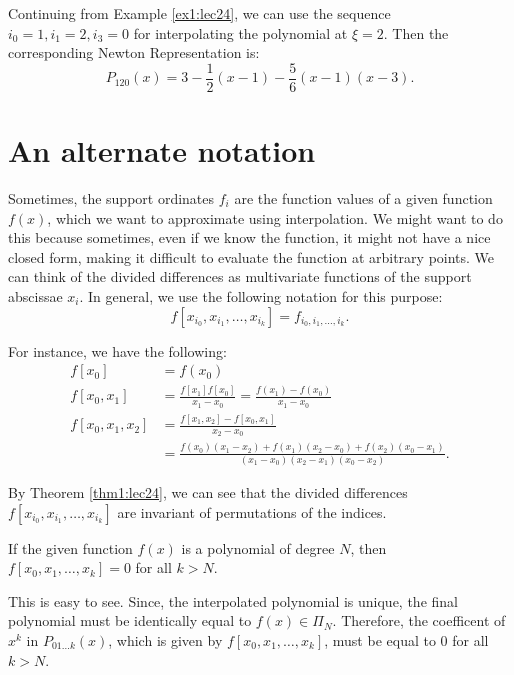 \begin{example}
    Continuing from Example \ref{ex1:lec24}, we can use the sequence $ i_0=1, i_1=2, i_3 = 0$ for interpolating the polynomial at $\xi = 2$. Then the corresponding Newton Representation is:
    \[
        P_{120}(x) = 3 - \frac{1}{2}(x-1) - \frac{5}{6} (x-1)(x-3)
    .\] 

\end{example}

\section{An alternate notation}

Sometimes, the support ordinates $f_i$ are the function values of a given function  $f(x)$, which we want to approximate using interpolation. We might want to do this because sometimes, even if we know the function, it might not have a nice closed form, making it difficult to evaluate the function at arbitrary points. We can think of the divided differences as multivariate functions of the support abscissae  $x_i$. In general, we use the following notation for this purpose:
\[
    f[x_{i_0},x_{i_1},\ldots, x_{i_k}] = f_{i_0,i_1,\ldots,i_k}
.\] 

For instance, we have the following:
\begin{align*}
    f[x_0] &= f(x_0)\\
    f[x_0,x_1] &= \frac{f[x_1]f[x_0]}{x_1-x_0} = \frac{f(x_1) - f(x_0)}{x_1-x_0} \\
    f[x_0,x_1,x_2] &= \frac{f[x_1,x_2] - f[x_0,x_1]}{x_2-x_0}\\
                   &= \frac{f(x_0)(x_1-x_2) + f(x_1)(x_2-x_0) + f(x_2)(x_0-x_1)}{(x_1-x_0)(x_2-x_1)(x_0-x_2)} 
.\end{align*}

By Theorem \ref{thm1:lec24}, we can see that the divided differences $f[x_{i_0},x_{i_1},\ldots,x_{i_k}]$ are invariant of permutations of the indices. 

\begin{thm}
    If the given function $f(x)$ is a polynomial of degree  $N$, then  $f[x_0,x_1,\ldots,x_k]=0$
    for all $k>N$.
\end{thm}

This is easy to see. Since, the interpolated polynomial is unique, the final polynomial must be identically equal to $f(x) \in \Pi _N$. Therefore, the coefficent of  $x^{k}$ in $P_{01\ldots k}(x)$, which is given by $f[x_0,x_1,\ldots,x_k]$, must be equal to $0$ for all  $k>N$.

